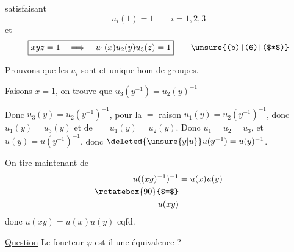 satisfaisant
\[
u_i(1)=1\qquad i=1,2,3
\]
et
\[
\boxed{xyz=1\quad\Longrightarrow\quad u_1(x)u_2(y)u_3(z)=1}\tag*{\unsure{(b)|(6)|($*$)}}
\]

Prouvons que les $u_i$ sont   et unique hom de groupes.

Faisons $x=1$, on trouve que $u_3(y^{-1})=u_2(y)^{-1}$

Donc $u_3(y)=u_2(y^{-1})^{-1}$, pour la $=$ raison $u_1(y)=u_2(y^{-1})^{-1}$, donc $u_1(y)=u_3(y)$ et de $=$ $u_1(y)=u_2(y)$. Donc $u_1=u_2=u_3$, et $u(y)=u(y^{-1})^{-1}$, donc $\deleted{\unsure{y|u}}u(y^{-1})=u(y)^{-1}$.

On tire maintenant de 
\[
\begin{aligned}
u((xy)^{-1})^{-1}&=u(x)u(y)\\
\rotatebox{90}{$=$}&\\
u(xy)&
\end{aligned}
\]
donc \qquad $u(xy)=u(x)u(y)$ \qquad cqfd.

\uline{Question} Le foncteur $\varphi$ est il une équivalence ?
